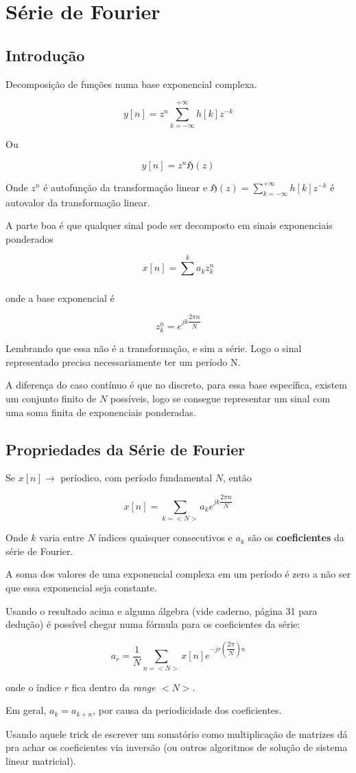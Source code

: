 \chapter{Série de Fourier}
\section{Introdução}

Decomposição de funções numa base exponencial complexa.

\[y[n] = z^{n} \sum^{+\infty}_{k = -\infty}h[k] z^{-k}\]

Ou 

\[y[n] = z^{n}\mathfrak{H}(z)\]

Onde $z^{n}$ é autofunção da transformação linear e $\mathfrak{H}(z) = \sum^{+\infty}_{k = -\infty}h[k] z^{-k}$ é autovalor da transformação linear.

A parte boa é que qualquer sinal pode ser decomposto em sinais exponenciais ponderados

\[x[n] = \sum^{k}_{}a_{k}z^n_k\]

onde a base exponencial é

\[z^n_k = e^{jk \dfrac{2 \pi n}{N}} \]

Lembrando que essa não é a transformação, e sim a série. Logo o sinal representado precisa necessariamente ter um período N.

A diferença do caso contínuo é que no discreto, para essa base específica, existem um conjunto finito de $N$ possíveis, logo se consegue representar um sinal com uma soma finita de exponenciais ponderadas.

\section{Propriedades da Série de Fourier}

Se $x[n] \rightarrow $ períodico, com período fundamental $N$, então

\[x[n] = \sum^{}_{k = <N>}a_{k}e^{jk \dfrac{2 \pi n}{N}}\]

Onde $k$ varia entre $N$ índices quaisquer consecutivos e $a_k$ são os \textbf{coeficientes} da série de Fourier.

\begin{theorem}
    A soma dos valores de uma exponencial complexa em um período é zero a não ser que essa exponencial seja constante.
\end{theorem}

Usando o resultado acima e alguma álgebra (vide caderno, página 31 para dedução) é possível chegar numa fórmula para os coeficientes da série:

\[a_{r} = \dfrac{1}{N} \sum^{}_{n = <N>}x[n]e^{-jr(\dfrac{2 \pi}{N})n}\]

onde o índice $r$ fica dentro da \it{range} $<N>$.

Em geral, $a_k = a_{k + n}$, por causa da periodicidade dos coeficientes.

Usando aquele trick de escrever um somatório como multiplicação de matrizes dá pra achar os coeficientes via inversão (ou outros algoritmos de solução de sistema linear matricial).





